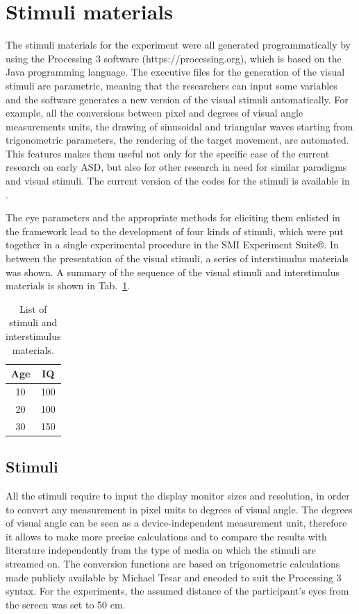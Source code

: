 \section{Stimuli materials}
\label{sec:expstimulimaterials}

The stimuli materials for the experiment were all generated programmatically by using the Processing 3 software (https://processing.org), which is based on the Java programming language. The executive files for the generation of the visual stimuli are parametric, meaning that the researchers can input some variables and the software generates a new version of the visual stimuli automatically. For example, all the conversions between pixel and degrees of visual angle measurements units, the drawing of sinusoidal and triangular waves starting from trigonometric parameters, the rendering of the target movement, are automated. This features makes them useful not only for the specific case of the current research on early ASD, but also for other research in need for similar paradigms and visual stimuli. The current version of the codes for the stimuli is available in .

The eye parameters and the appropriate methods for eliciting them enlisted in the framework  lead to the development of four kinds of stimuli, which were put together in a single experimental procedure in the SMI Experiment Suite®. In between the presentation of the visual stimuli, a series of interstimulus materials was shown. A summary of the sequence of the visual stimuli and interstimulus materials is shown in Tab.~\ref{tab:stimulisummary}.

\begin{table}[h]
  \centering
  \begin{tabular}{c|c}
    Age  & IQ  \\ 
    \hline
    10   & 100 \\
    20   & 100 \\
    30   & 150
  \end{tabular}
  \caption{List of stimuli and interstimulus materials.}
  \label{tab:stimulisummary}
\end{table}

\subsection{Stimuli}
\label{sec:expstimuli}

All the stimuli require to input the display monitor sizes and resolution, in order to convert any measurement in pixel units to degrees of visual angle. The degrees of visual angle can be seen as a device-independent measurement unit, therefore it allows to make more precise calculations and to compare the results with literature independently from the type of media on which the stimuli are streamed on. The conversion functions are based on trigonometric calculations made publicly available by Michael Tesar and encoded to suit the Processing 3 syntax. For the experiments, the assumed distance of the participant’s eyes from the screen was set to 50 cm.


